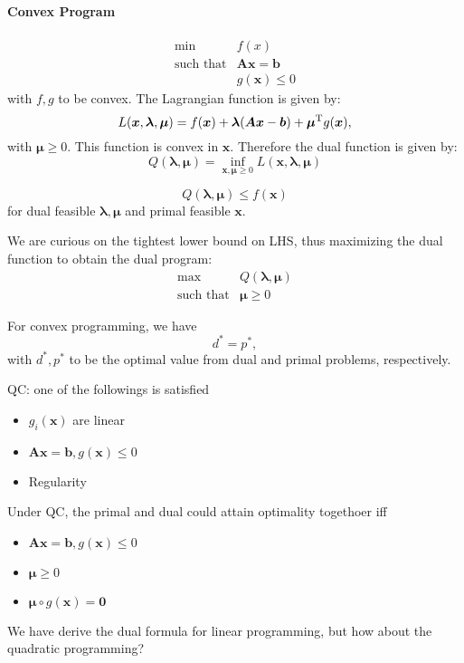 \paragraph{Convex Program}
\[
\begin{array}{ll}
\min&f(x)\\
\mbox{such that}&\bm{Ax}=\bm b\\
&g(\bm x)\le0
\end{array}
\]
with $f,g$ to be convex. The Lagrangian function is given by:
\[
L(\bm x,\bm\lambda,\bm\mu)=f(\bm x)+\bm\lambda(\bm{Ax}-\bm b)+\bm\mu^{\mathrm T} g(\bm x),
\]
with $\bm\mu\ge0$. This function is convex in $\bm x$. Therefore the dual function is given by:
\[
Q(\bm\lambda,\bm\mu)=\inf_{\bm x,\bm\mu\ge0}L(\bm x,\bm\lambda,\bm\mu)
\]
\begin{proposition}
\[
Q(\bm\lambda,\bm\mu)\le f(\bm x)
\]
for dual feasible $\bm\lambda,\bm\mu$ and primal feasible $\bm x$.
\end{proposition}
We are curious on the tightest lower bound on LHS, thus maximizing the dual function to obtain the dual program:
\[
\begin{array}{ll}
\max&Q(\bm\lambda,\bm\mu)\\
\mbox{such that}&\bm\mu\ge0
\end{array}
\]
\begin{proposition}
For convex programming, we have
\[
d^*=p^*,
\]
with $d^*,p^*$ to be the optimal value from dual and primal problems, respectively.
\end{proposition}
QC: one of the followings is satisfied
\begin{itemize}
\item
$g_i(\bm x)$ are linear
\item
$\bm{Ax}=\bm b, g(\bm x)\le0$
\item
Regularity
\end{itemize}
Under QC, the primal and dual could attain optimality togethoer iff
\begin{itemize}
\item
$\bm{Ax}=\bm b,g(\bm x)\le0$
\item
$\bm\mu\ge0$
\item
$\bm\mu\circ g(\bm x)=\bm0$
\end{itemize}
We have derive the dual formula for linear programming, but how about the quadratic programming?
